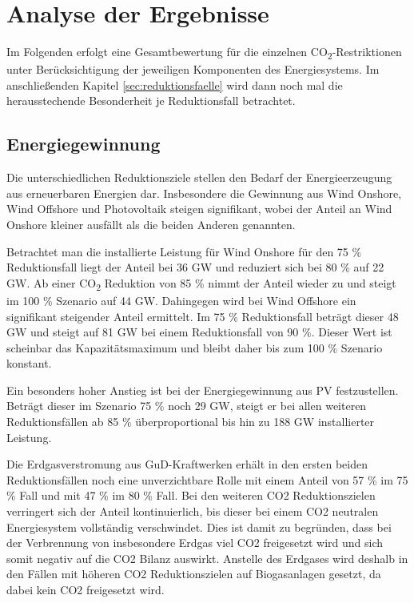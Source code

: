 \section{Analyse der Ergebnisse}
\label{sec:gesamtanalyse}
Im Folgenden erfolgt eine Gesamtbewertung für die einzelnen CO\textsubscript{2}-Restriktionen unter Berücksichtigung der jeweiligen Komponenten des Energiesystems. Im anschließenden Kapitel \ref{sec:reduktionsfaelle} wird dann noch mal die herausstechende Besonderheit je Reduktionsfall betrachtet. 

\subsection{Energiegewinnung}
Die unterschiedlichen Reduktionsziele stellen den Bedarf der Energieerzeugung aus erneuerbaren Energien dar. Insbesondere die Gewinnung aus Wind Onshore, Wind Offshore und Photovoltaik steigen signifikant, wobei der Anteil an Wind Onshore kleiner ausfällt als die beiden Anderen genannten. 

Betrachtet man die installierte Leistung für Wind Onshore für den 75 \% Reduktionsfall liegt der Anteil bei 36 GW und reduziert sich bei 80 \% auf 22 GW. Ab einer CO\textsubscript{2} Reduktion von 85 \% nimmt der Anteil wieder zu und steigt im 100 \% Szenario auf 44 GW. 
Dahingegen wird bei Wind Offshore ein signifikant steigender Anteil ermittelt. Im 75 \% Reduktionsfall beträgt dieser 48 GW und steigt auf 81 GW bei einem Reduktionsfall von 90 \%. Dieser Wert ist scheinbar das Kapazitätsmaximum und bleibt daher bis zum 100 \% Szenario konstant.

Ein besonders hoher Anstieg ist bei der Energiegewinnung aus PV festzustellen. Beträgt dieser im Szenario 75 \% noch 29 GW, steigt er bei allen weiteren Reduktionsfällen ab 85 \% überproportional bis hin zu 188 GW installierter Leistung.

Die Erdgasverstromung aus GuD-Kraftwerken erhält in den ersten beiden Reduktionsfällen noch eine unverzichtbare Rolle mit einem Anteil von 57 \% im 75 \% Fall und mit 47 \% im 80 \% Fall. Bei den weiteren CO2 Reduktionszielen verringert sich der Anteil kontinuierlich, bis dieser bei einem CO2 neutralen Energiesystem vollständig verschwindet. Dies ist damit zu begründen, dass bei der Verbrennung von insbesondere Erdgas viel CO2 freigesetzt wird und sich somit negativ auf die CO2 Bilanz auswirkt. Anstelle des Erdgases wird deshalb in den Fällen mit höheren CO2 Reduktionszielen auf Biogasanlagen gesetzt, da dabei kein CO2 freigesetzt wird. 


